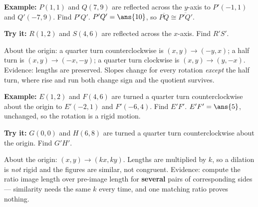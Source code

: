 \documentclass[12pt]{article}
\begin{document}
\begin{examplebox}
\textbf{Example:} $P(1,1)$ and $Q(7,9)$ are reflected across the $y$-axis to
$P'(-1,1)$ and $Q'(-7,9)$. Find $P'Q'$.
$P'Q' = \ans{10}$, so $\overline{PQ} \cong \overline{P'Q'}$.
\end{examplebox}

\begin{tryitbox}
\textbf{Try it:} $R(1,2)$ and $S(4,6)$ are reflected across the $x$-axis. Find
$R'S'$.\\[2pt]
\end{tryitbox}


\begin{formulabox}
About the origin: a quarter turn counterclockwise is
$(x,y) \rightarrow (-y,x)$; a half turn is $(x,y) \rightarrow (-x,-y)$; a
quarter turn clockwise is $(x,y) \rightarrow (y,-x)$. Evidence: lengths are
preserved. Slopes change for every rotation \emph{except} the half turn, where
rise and run both change sign and the quotient survives.
\end{formulabox}

\begin{examplebox}
\textbf{Example:} $E(1,2)$ and $F(4,6)$ are turned a quarter turn
counterclockwise about the origin to $E'(-2,1)$ and $F'(-6,4)$. Find $E'F'$.
$E'F' = \ans{5}$, unchanged, so the rotation is a rigid motion.
\end{examplebox}

\begin{tryitbox}
\textbf{Try it:} $G(0,0)$ and $H(6,8)$ are turned a quarter turn
counterclockwise about the origin. Find $G'H'$.\\[2pt]
\end{tryitbox}


\begin{formulabox}
About the origin: $(x,y) \rightarrow (kx, ky)$. Lengths are multiplied by $k$,
so a dilation is \emph{not} rigid and the figures are similar, not congruent.
Evidence: compute the ratio image length over pre-image length for
\textbf{several} pairs of corresponding sides --- similarity needs the same $k$
every time, and one matching ratio proves nothing.
\end{formulabox}
\end{document}

